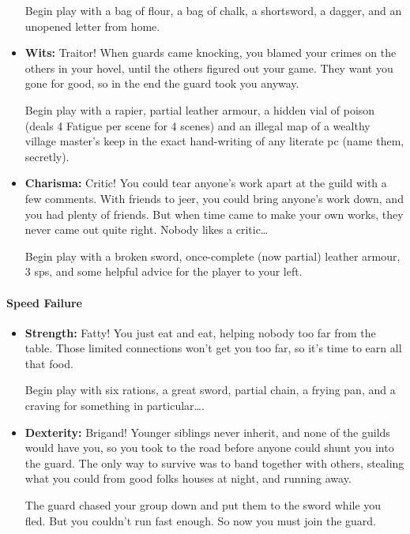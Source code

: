 \begin{multicols}{2}
\begin{itemize}
  Begin play with a bag of flour, a bag of chalk, a shortsword, a dagger, and an unopened letter from home.

  \item
  \textbf{Wits:}
  Traitor!
  When guards came knocking, you blamed your crimes on the others in your hovel, until the others figured out your game.
  They want you gone for good, so in the end the \gls{guard} took you anyway.

  Begin play with a rapier, partial leather armour, a hidden vial of poison (deals 4 Fatigue per scene for 4 scenes) and an illegal map of a wealthy village master's keep in the exact hand-writing of any literate \gls{pc} (name them, secretly).
  \item
  \textbf{Charisma:}
  Critic!
  You could tear anyone's work apart at the guild with a few comments.
  With friends to jeer, you could bring anyone's work down, and you had plenty of friends.
  But when time came to make your own works, they never came out quite right.
  Nobody likes a critic\ldots
  
  Begin play with a broken sword, once-complete (now partial) leather armour, 3 \glspl{sp}, and some helpful advice for the player to your left.

\end{itemize}

\paragraph{Speed Failure}

\begin{itemize}

  \item
  \textbf{Strength:}
  Fatty!
  You just eat and eat, helping nobody too far from the table.
  Those limited connections won't get you too far, so it's time to earn all that food.

  Begin play with six rations, a great sword, partial chain, a frying pan, and a craving for something in particular\ldots.

  \item
  \textbf{Dexterity:}
  Brigand!
  Younger siblings never inherit, and none of the guilds would have you, so you took to the road before anyone could shunt you into the \gls{guard}.
  The only way to survive was to band together with others, stealing what you could from good folks houses at night, and running away.

  The \gls{guard} chased your group down and put them to the sword while you fled.
  But you couldn't run fast enough.
  So now you must join the guard.


\end{itemize}
\end{multicols}
